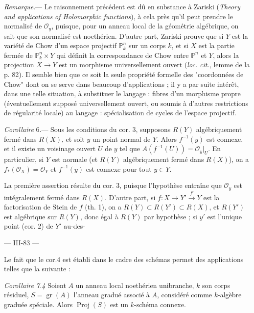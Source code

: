 \emph{Remarque}.— Le raisonnement précédent est dû en substance à Zariski (\emph{Theory and applications of Holomorphic functions}), à cela près qu'il peut prendre le normalisé de $\mathcal{O}_y$, puisque, pour un anneau local de la géométrie algébrique, on sait que son normalisé est noethérien. D'autre part, Zariski prouve que si $Y$ est la variété de Chow d'un espace projectif $\mathbb{P}^n_k$ sur un corps $k$, et si $X$ est la partie fermée de $\mathbb{P}^n_k \times Y$ qui définit la correspondance de Chow entre $\mathbb{P}^n$ et $Y$, alors la projection $X \to Y$ est un morphisme universellement ouvert (\emph{loc. cit.}, lemme de la p. 82). Il semble bien que ce soit la seule propriété formelle des "coordonnées de Chow" dont on se serve dans beaucoup d'applications ; il y a par suite intérêt, dans une telle situation, à substituer le langage : fibres d'un morphisme propre (éventuellement supposé universellement ouvert, ou soumis à d'autres restrictions de régularité locale) au langage : spécialisation de cycles de l'espace projectif.

\emph{Corollaire} 6.— Sous les conditions du cor. 3, supposons $R(Y)$ algébriquement fermé dans $R(X)$, et soit $y$ un point normal de $Y$. Alors $f^{-1}(y)$ est connexe, et il existe un voisinage ouvert $U$ de $y$ tel que $A(f^{-1}(U)) = \mathcal{O}_y|_U$. En particulier, si $Y$ est normale (et $R(Y)$ algébriquement fermé dans $R(X)$), on a $f_*(\mathcal{O}_X) = \mathcal{O}_Y$ et $f^{-1}(y)$ est connexe pour tout $y \in Y$.

La première assertion résulte du cor. 3, puisque l'hypothèse entraîne que $\mathcal{O}_y$ est intégralement fermé dans $R(X)$. D'autre part, si $f : X \to Y' \xrightarrow{f'} Y$ est la factorisation de Stein de $f$ (th. 1), on a $R(Y) \subset R(Y') \subset R(X)$, et $R(Y')$ est algébrique sur $R(Y)$, donc égal à $R(Y)$ par hypothèse ; si $y'$ est l'unique point (cor. 2) de $Y'$ au-des-

\newpage


--- III-83 ---

Le fait que le cor.4 est établi dans le cadre des schémas permet des applications telles que la suivante :

\emph{Corollaire 7.4} Soient $A$ un anneau local noethérien unibranche, $k$ son corps résiduel, $S = \operatorname{gr}(A)$ l'anneau gradué associé à $A$, considéré comme $k$-algèbre graduée spéciale. Alors $\operatorname{Proj}(S)$ est un $k$-schéma connexe.

